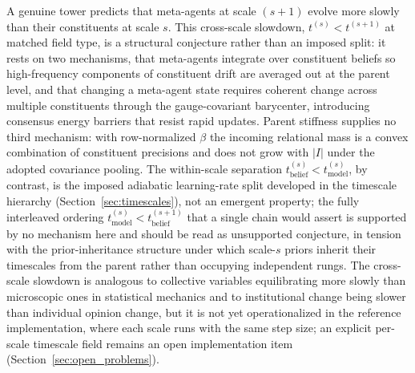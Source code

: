 \documentclass[11pt]{article}
\begin{document}
A genuine tower predicts that meta-agents at scale $(s+1)$ evolve more slowly than their constituents at scale $s$. This cross-scale slowdown, $t^{(s)} < t^{(s+1)}$ at matched field type, is a structural conjecture rather than an imposed split: it rests on two mechanisms, that meta-agents integrate over constituent beliefs so high-frequency components of constituent drift are averaged out at the parent level, and that changing a meta-agent state requires coherent change across multiple constituents through the gauge-covariant barycenter, introducing consensus energy barriers that resist rapid updates. Parent stiffness supplies no third mechanism: with row-normalized $\beta$ the incoming relational mass is a convex combination of constituent precisions and does not grow with $|I|$ under the adopted covariance pooling. The within-scale separation $t_{\mathrm{belief}}^{(s)} < t_{\mathrm{model}}^{(s)}$, by contrast, is the imposed adiabatic learning-rate split developed in the timescale hierarchy (Section~\ref{sec:timescales}), not an emergent property; the fully interleaved ordering $t_{\mathrm{model}}^{(s)} < t_{\mathrm{belief}}^{(s+1)}$ that a single chain would assert is supported by no mechanism here and should be read as unsupported conjecture, in tension with the prior-inheritance structure under which scale-$s$ priors inherit their timescales from the parent rather than occupying independent rungs. The cross-scale slowdown is analogous to collective variables equilibrating more slowly than microscopic ones in statistical mechanics and to institutional change being slower than individual opinion change, but it is not yet operationalized in the reference implementation, where each scale runs with the same step size; an explicit per-scale timescale field remains an open implementation item (Section~\ref{sec:open_problems}).
\end{document}

